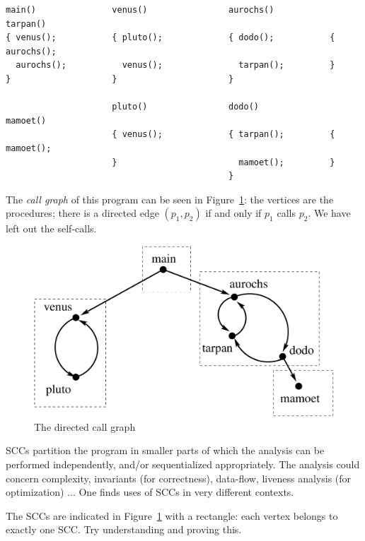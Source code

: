 \begin{Verbatim}[frame=single, samepage=true, fontsize=\scriptsize]
main()               venus()                aurochs()           tarpan()
{ venus();           { pluto();             { dodo();           { aurochs();
  aurochs();           venus();               tarpan();         }
}                    }                      }

                     pluto()                dodo()              mamoet()
                     { venus();             { tarpan();         { mamoet();
                     }                        mamoet();         }
                                            }
\end{Verbatim}
The {\em call graph} of this program can be seen in
Figure~\ref{vbtarjan}: the vertices are the procedures; there is a
directed edge $(p_1,p_2)$ if and only if $p_1$ calls $p_2$. We have
left out the self-calls.


\begin{figure}[h]
\begin{center}
\includegraphics[height=0.2\textheight,keepaspectratio]{vbtarjan}
\caption{The directed call graph}\label{vbtarjan}
\end{center}
\end{figure}

SCCs partition the program in smaller parts of which the analysis can
be performed independently, and/or sequentialized
appropriately. The analysis could concern complexity, invariants (for
correctness), data-flow, liveness analysis (for optimization) ... One
finds uses of SCCs in very different contexts.


The SCCs are indicated in Figure~\ref{vbtarjan} with a rectangle: each
vertex belongs to exactly one SCC. Try understanding and proving this.

